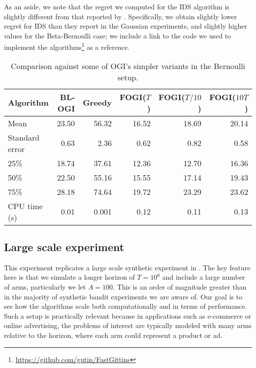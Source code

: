 As an aside, we note that the regret we computed for the IDS algorithm is slightly different from that reported by \cite{russo2014learning}. Specifically, we obtain slightly lower regret for IDS than they report in the Gaussian experiments, and slightly higher values for the Beta-Bernoulli case; we include a link to the code we used to implement the algorithms\footnote{\url{https://github.com/gutin/FastGittins}} as a reference.  


\begin{table}[h!]
	\centering
	{\color{blue}
		\begin{tabular}{lrrrrr}
			\toprule
			\textbf{Algorithm} &  \textbf{BL-OGI} &  \textbf{Greedy} &  \textbf{FOGI($T$)} &  \textbf{FOGI($T/10$)} &  \textbf{FOGI($10T$)} \\
			\midrule
			Mean  &   23.50 &   56.32 &      16.52 &         18.69 &        20.14 \\
			Standard error  &    0.63 &    2.36 &       0.62 &          0.82 &         0.58 \\
			25\%   &   18.74 &   37.61 &      12.36 &         12.70 &        16.36 \\
			50\%   &   22.50 &   55.16 &      15.55 &         17.14 &        19.43 \\
			75\%   &   28.18 &   74.64 &      19.72 &         23.29 &        23.62 \\
			CPU time (s)  &   0.01 &  0.001 &   0.12 &         0.11 &      0.13  \\
			\bottomrule
		\end{tabular}
		\caption[Table caption text]{\color{blue}Comparison against some of OGI's simpler variants in the  Bernoulli setup.}
		\label{table:bernoulli_experiment2}
	}
\end{table}

\subsection{Large scale experiment} \label{exp:ts_sampling_experiment}
This experiment replicates a large scale synthetic experiment in \cite{chapelle2011empirical}.
The key feature here is that we simulate a  longer horizon of $T = 10^6$ and include a large number of arms, particularly we let $A = 100$. This is an order of magnitude greater than in the majority of synthetic bandit experiments we are aware of.
Our goal is to see how the algorithms scale both computationally and in terms of performance.
Such a setup is practically relevant because in applications such as e-commerce or online advertising, the problems of interest are typically modeled with many arms relative to the horizon, where each arm could represent a product or ad.

